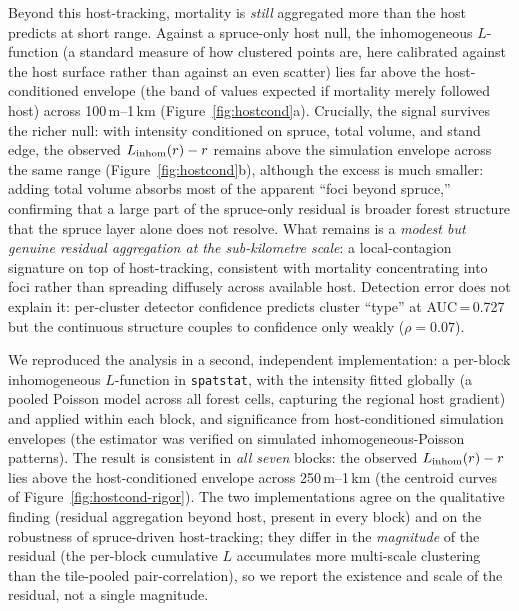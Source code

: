 \documentclass[twocolumn]{article}
\begin{document}
Beyond this host-tracking, mortality is \emph{still} aggregated more than the host predicts at short
range. Against a spruce-only host null, the inhomogeneous $L$-function (a standard measure of how
clustered points are, here calibrated against the host surface rather than against an even scatter)
lies far above the host-conditioned envelope (the band of values expected if mortality merely
followed host) across 100\,m--1\,km (Figure~\ref{fig:hostcond}a). Crucially, the signal
survives the richer null: with intensity conditioned on spruce, total volume, and stand edge, the
observed $L_{\rm inhom}(r)-r$ remains above the simulation envelope across the same range
(Figure~\ref{fig:hostcond}b), although the excess is much smaller: adding total volume absorbs most
of the apparent ``foci beyond spruce,'' confirming that a large part of the spruce-only residual is
broader forest structure that the spruce layer alone does not resolve. What remains is a
\emph{modest but genuine residual aggregation at the sub-kilometre scale}: a local-contagion
signature on top of host-tracking, consistent with mortality concentrating into foci rather than
spreading diffusely across available host. Detection error does not explain it: per-cluster
detector confidence predicts cluster ``type'' at AUC\,=\,0.727 but the continuous structure couples
to confidence only weakly ($\rho=0.07$).

We reproduced the analysis in a second, independent implementation: a per-block
inhomogeneous $L$-function in \texttt{spatstat}, with the intensity fitted globally (a pooled
Poisson model across all forest cells, capturing the regional host gradient) and applied within each
block, and significance from host-conditioned simulation envelopes (the estimator was verified on
simulated inhomogeneous-Poisson patterns). The result is consistent in \emph{all seven} blocks: the
observed $L_{\rm inhom}(r)-r$ lies above the host-conditioned envelope across 250\,m--1\,km
(the centroid curves of Figure~\ref{fig:hostcond-rigor}). The two implementations agree on the qualitative finding (residual
aggregation beyond host, present in every block) and on the robustness of spruce-driven
host-tracking; they differ in the \emph{magnitude} of the residual (the per-block cumulative $L$
accumulates more multi-scale clustering than the tile-pooled pair-correlation), so we report the
existence and scale of the residual, not a single magnitude.
\end{document}
